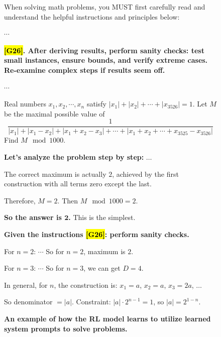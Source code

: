 \documentclass{article}
\theoremstyle{plain}
\theoremstyle{definition}
\theoremstyle{remark}
\begin{document}
\begin{figure}[!tb]
\centering
\caption{\textbf{An example of how the RL model learns to utilize learned system prompts to solve problems.}}

\begin{runcard}[title={Example of How E-SPL Shapes Model Behavior}]

\medskip

\begin{runbox}[title={\textbf{Learned System Prompt}}]
When solving math problems, you MUST first carefully read and understand the helpful instructions and principles below:

$\cdots$

\textbf{\color{Brown}\hl{{[G26]}}. After deriving results, perform sanity checks: test small instances, ensure bounds, and verify extreme cases. Re-examine complex steps if results seem off.}

$\cdots$
\end{runbox}

\begin{runbox}[title={Problem}]
Real numbers \(x_1,x_2,\cdots,x_n\) satisfy
\(|x_1|+|x_2|+\cdots+|x_{3526}| = 1\). Let \(M\) be the maximal possible value of
\[
\frac{1}{|x_1|+|x_1 - x_2|+|x_1 + x_2 - x_3|+\cdots+|x_1 + x_2+\cdots+x_{3525}-x_{3526}|}
\]
Find \(M\mod 1000\).

\end{runbox}

\begin{runbox}[title={Model Output}]

\textbf{Let's analyze the problem step by step:} $\dots$

The correct maximum is actually $2$, achieved by the first construction with all terms zero except the last.

Therefore, $M = 2$. Then $M \mod 1000 = 2$.

\textbf{So the answer is $\boldsymbol{2}$.} This is the simplest.

\medskip
{\color{Brown}\textbf{Given the instructions \hl{[G26]}: perform sanity checks.}}

For $n=2$: $\cdots$ So for $n=2$, maximum is $2$.

For $n=3$: $\cdots$ So for $n=3$, we can get $D=4$.

In general, for $n$, the construction is: $x_1 = a$, $x_2 = a$, $x_3 = 2a$, $\dots$

So denominator $= |a|$. Constraint: $|a| \cdot 2^{n-1} = 1$, so $|a| = 2^{1-n}$.


\end{runbox}
\end{runcard}
\end{figure}
\end{document}

